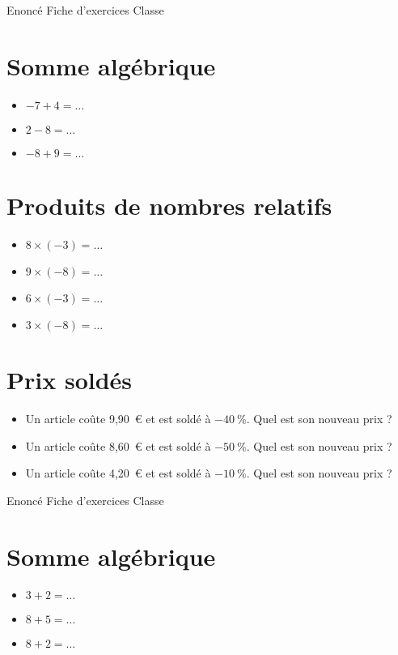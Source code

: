 \documentclass[a4paper,11pt,fleqn]{article}		%
\begin{document}
{Enoncé} \hfill {\huge Fiche d'exercices } \hfill {Classe}

\section{Somme algébrique}
\begin{itemize}

  \item $-7 +4=\ldots$
  \item $2 -8=\ldots$
  \item $-8 +9=\ldots$
\end{itemize}


\section{Produits de nombres relatifs}
\begin{itemize}

  \item $8\times(-3)=\ldots$
  \item $9\times(-8)=\ldots$
  \item $6\times(-3)=\ldots$
  \item $3\times(-8)=\ldots$
\end{itemize}


\section{Prix soldés}
\begin{itemize}

  \item Un article coûte 9,90~€ et est soldé à $-40~\%$. Quel est son nouveau prix ?
  \item Un article coûte 8,60~€ et est soldé à $-50~\%$. Quel est son nouveau prix ?
  \item Un article coûte 4,20~€ et est soldé à $-10~\%$. Quel est son nouveau prix ?
\end{itemize}
\newpage
\setcounter{exo}{0}
\setcounter{section}{0}
{Enoncé} \hfill {\huge Fiche d'exercices } \hfill {Classe}

\section{Somme algébrique}
\begin{itemize}

  \item $3 +2=\ldots$
  \item $8 +5=\ldots$
  \item $8 +2=\ldots$
\end{itemize}
\end{document}

